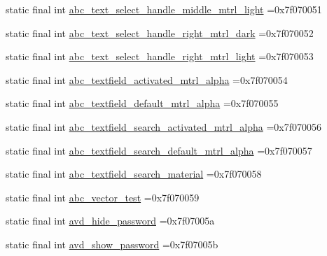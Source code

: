 \begin{DoxyCompactItemize}
\item 
static final int \mbox{\hyperlink{classbr_1_1unb_1_1cic_1_1mp_1_1marketmaster_1_1R_1_1drawable_a7d7e23ad87b9e8f2e21421435c3a5781}{abc\+\_\+text\+\_\+select\+\_\+handle\+\_\+middle\+\_\+mtrl\+\_\+light}} =0x7f070051
\item 
static final int \mbox{\hyperlink{classbr_1_1unb_1_1cic_1_1mp_1_1marketmaster_1_1R_1_1drawable_afe4a6d3953e750bcee7f2c35544d0da0}{abc\+\_\+text\+\_\+select\+\_\+handle\+\_\+right\+\_\+mtrl\+\_\+dark}} =0x7f070052
\item 
static final int \mbox{\hyperlink{classbr_1_1unb_1_1cic_1_1mp_1_1marketmaster_1_1R_1_1drawable_a9d2511eddc5d8ea82f8a8d2715cbd2b1}{abc\+\_\+text\+\_\+select\+\_\+handle\+\_\+right\+\_\+mtrl\+\_\+light}} =0x7f070053
\item 
static final int \mbox{\hyperlink{classbr_1_1unb_1_1cic_1_1mp_1_1marketmaster_1_1R_1_1drawable_aeabafec328546ef52a1d00dea4ff7bb8}{abc\+\_\+textfield\+\_\+activated\+\_\+mtrl\+\_\+alpha}} =0x7f070054
\item 
static final int \mbox{\hyperlink{classbr_1_1unb_1_1cic_1_1mp_1_1marketmaster_1_1R_1_1drawable_aca076a21df6623d2c3084d3f054146a0}{abc\+\_\+textfield\+\_\+default\+\_\+mtrl\+\_\+alpha}} =0x7f070055
\item 
static final int \mbox{\hyperlink{classbr_1_1unb_1_1cic_1_1mp_1_1marketmaster_1_1R_1_1drawable_ad9095b6afe46de8f7883521b53e2a25a}{abc\+\_\+textfield\+\_\+search\+\_\+activated\+\_\+mtrl\+\_\+alpha}} =0x7f070056
\item 
static final int \mbox{\hyperlink{classbr_1_1unb_1_1cic_1_1mp_1_1marketmaster_1_1R_1_1drawable_a696e9ac77e6e33ab2817001ef309aa01}{abc\+\_\+textfield\+\_\+search\+\_\+default\+\_\+mtrl\+\_\+alpha}} =0x7f070057
\item 
static final int \mbox{\hyperlink{classbr_1_1unb_1_1cic_1_1mp_1_1marketmaster_1_1R_1_1drawable_a3ede7991713468ace747a49f46505c49}{abc\+\_\+textfield\+\_\+search\+\_\+material}} =0x7f070058
\item 
static final int \mbox{\hyperlink{classbr_1_1unb_1_1cic_1_1mp_1_1marketmaster_1_1R_1_1drawable_ae25d6217d8fd7c8662b4f57bb1e9551d}{abc\+\_\+vector\+\_\+test}} =0x7f070059
\item 
static final int \mbox{\hyperlink{classbr_1_1unb_1_1cic_1_1mp_1_1marketmaster_1_1R_1_1drawable_a33faedea5db7a80228918ed5ad766b43}{avd\+\_\+hide\+\_\+password}} =0x7f07005a
\item 
static final int \mbox{\hyperlink{classbr_1_1unb_1_1cic_1_1mp_1_1marketmaster_1_1R_1_1drawable_a70523b639f01494756dabc2d219cc384}{avd\+\_\+show\+\_\+password}} =0x7f07005b

\end{DoxyCompactItemize}

